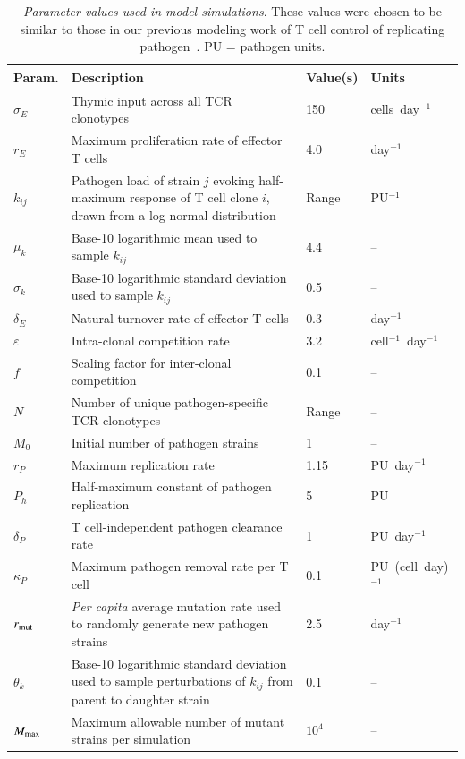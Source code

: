 \begin{table}[ht]
\footnotesize
\centering
\begin{tabular}{p{} p{} p{} p{}}
    \hline
    \textbf{Param.} & \textbf{Description}                                             & \textbf{Value(s)} & \textbf{Units} \\
    \hline
    $\sigma_E$ & Thymic input across all TCR clonotypes & 150 & cells~day$^{-1}$ \\
    $r_E$ & Maximum proliferation rate of effector T cells & 4.0 & day$^{-1}$ \\
    $k_{ij}$ & Pathogen load of strain $j$ evoking half-maximum response of T cell clone $i$, drawn from a log-normal distribution &  Range & PU$^{-1}$ \\
    $\mu_k$ & Base-10 logarithmic mean used to sample $k_{ij}$ & 4.4 & --
    \\
    $\sigma_k$ & Base-10 logarithmic standard deviation used to sample $k_{ij}$ & 0.5 & -- \\
    $\delta_E$ & Natural turnover rate of effector T cells & 0.3 & day$^{-1}$ \\
    $\varepsilon$ & Intra-clonal competition rate & 3.2\E{-6} & cell$^{-1}$~day$^{-1}$ \\
    $f$ & Scaling factor for inter-clonal competition & 0.1 & -- \\
    $N$ & Number of unique pathogen-specific TCR clonotypes & Range & -- \\
    $M_0$ & Initial number of pathogen strains & 1 & -- \\
    $r_{P}$ & Maximum replication rate & 1.15\E{5} & PU~day$^{-1}$ \\
    $P_h$ & Half-maximum constant of pathogen replication & 5\E{2} & PU \\
    $\delta_P$ & T cell-independent pathogen clearance rate & 1 & PU~day$^{-1}$ \\
    $\kappa_P$ & Maximum pathogen removal rate per T cell & 0.1 & PU~(cell~day)$^{-1}$ \\
    $r_{\textup{mut}}$ & \textit{Per capita} average mutation rate used to randomly generate new pathogen strains & 2.5\E{-5} & day$^{-1}$ \\
    $\theta_k$ & Base-10 logarithmic standard deviation used to sample perturbations of $k_{ij}$ from parent to daughter strain & 0.1 & --\\
    $M_{\textup{max}}$ & Maximum allowable number of mutant strains per simulation & $10^4$ & -- \\
    \hline
\end{tabular}
\caption[Parameter values used in model simulations]{\textit{Parameter values used in model simulations}. These values were chosen to be similar to those in our previous modeling work of T cell control of replicating pathogen~\cite{jamaleddine2022chronic}. PU = pathogen units.}
\label{tab:VE_parameters}
\end{table}

